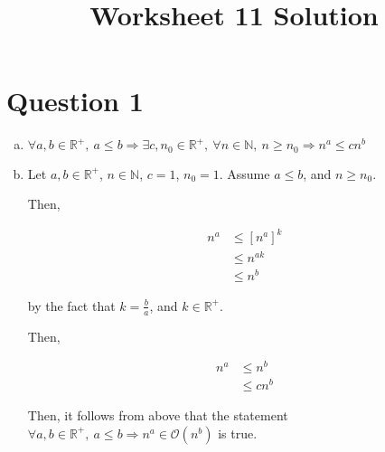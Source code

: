 \documentclass[12pt]{article}
\begin{document}
\title{Worksheet 11 Solution}
\maketitle

\section*{Question 1}
\begin{enumerate}[a.]
    \item

    $\forall a,b \in \mathbb{R}^{+},\: a \leq b \Rightarrow \exists c,n_0 \in \mathbb{R}^{+},
    \:\forall n \in \mathbb{N},\: n \geq n_0 \Rightarrow n^a \leq cn^b$

    \item


    Let $a,b \in \mathbb{R}^{+}$, $n \in \mathbb{N}$, $c = 1$, $n_0 = 1$.
    Assume $a \leq b$, and $n \geq n_0$.

    \bigskip

    Then,

    \begin{align}
        n^a &\leq \left[ n^a \right]^k\\
        &\leq n^{ak}\\
        &\leq n^b
    \end{align}

    by the fact that $k = \frac{b}{a}$, and $k \in \mathbb{R}^{+}$.

    \bigskip

    Then,

    \begin{align}
        n^a &\leq n^b\\
        &\leq cn^b
    \end{align}

    \bigskip

    Then, it follows from above that the statement $\forall a,b \in \mathbb{R}^{+},
    \:a \leq b \Rightarrow n^a \in \mathcal{O}(n^b)$ is true.


\end{enumerate}
\end{document}
